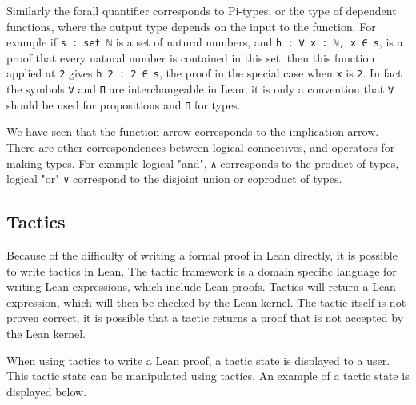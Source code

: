 \documentclass[12pt]{article} %
\theoremstyle{definition}
\theoremstyle{definition}
\theoremstyle{definition}
\theoremstyle{definition}
\theoremstyle{definition}
\theoremstyle{definition}
\begin{document}
Similarly the forall quantifier corresponds to Pi-types, or the type of dependent functions,
where the output type depends on the input to the function.
For example if \lstinline{s : set ℕ} is a set of natural numbers,
and \lstinline{h : ∀ x : ℕ, x ∈ s}, is a proof that every natural number is contained
in this set, then this function applied at \lstinline{2} gives \lstinline{h 2 : 2 ∈ s},
the proof in the special case when \lstinline{x} is \lstinline{2}. In fact the
symbols \lstinline{∀} and \lstinline{Π} are interchangeable in Lean, it is only a
convention that \lstinline{∀} should be used for propositions and \lstinline{Π} for types.

We have seen that the function arrow corresponds to the implication arrow. There
are other correspondences between logical connectives, and operators for making types.
For example logical "and", \lstinline{∧} corresponds to the product of types,
logical "or" \lstinline{∨} correspond to the disjoint union or coproduct of types.

\subsection{Tactics}

Because of the difficulty of writing a formal proof in Lean directly, it is possible
to write tactics in Lean. The tactic framework is a domain specific language for writing
Lean expressions, which include Lean proofs. Tactics will return a Lean expression,
which will then be checked by the Lean kernel. The tactic itself is not proven correct,
it is possible that a tactic returns a proof that is not accepted by the Lean kernel.

When using tactics to write a Lean proof, a tactic state is displayed to a user.
This tactic state can be manipulated using tactics. An example of a tactic state is displayed
below.
\end{document}
